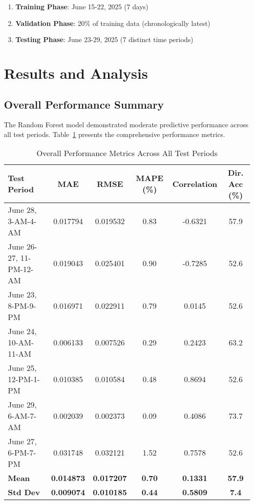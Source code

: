 \documentclass[11pt,a4paper]{article}
\begin{document}
\begin{enumerate}
    \item \textbf{Training Phase}: June 15-22, 2025 (7 days)
    \item \textbf{Validation Phase}: 20\% of training data (chronologically latest)
    \item \textbf{Testing Phase}: June 23-29, 2025 (7 distinct time periods)
\end{enumerate}

\section{Results and Analysis}

\subsection{Overall Performance Summary}

The Random Forest model demonstrated moderate predictive performance across all test periods. Table~\ref{tab:overall_performance} presents the comprehensive performance metrics.

\begin{table}[H]
\centering
\caption{Overall Performance Metrics Across All Test Periods}
\label{tab:overall_performance}
\begin{tabular}{lccccc}
\toprule
\textbf{Test Period} & \textbf{MAE} & \textbf{RMSE} & \textbf{MAPE (\%)} & \textbf{Correlation} & \textbf{Dir. Acc (\%)} \\
\midrule
June 28, 3-AM-4-AM & 0.017794 & 0.019532 & 0.83 & -0.6321 & 57.9 \\
June 26-27, 11-PM-12-AM & 0.019043 & 0.025401 & 0.90 & -0.7285 & 52.6 \\
June 23, 8-PM-9-PM & 0.016971 & 0.022911 & 0.79 & 0.0145 & 52.6 \\
June 24, 10-AM-11-AM & 0.006133 & 0.007526 & 0.29 & 0.2423 & 63.2 \\
June 25, 12-PM-1-PM & 0.010385 & 0.010584 & 0.48 & 0.8694 & 52.6 \\
June 29, 6-AM-7-AM & 0.002039 & 0.002373 & 0.09 & 0.4086 & 73.7 \\
June 27, 6-PM-7-PM & 0.031748 & 0.032121 & 1.52 & 0.7578 & 52.6 \\
\midrule
\textbf{Mean} & \textbf{0.014873} & \textbf{0.017207} & \textbf{0.70} & \textbf{0.1331} & \textbf{57.9} \\
\textbf{Std Dev} & \textbf{0.009074} & \textbf{0.010185} & \textbf{0.44} & \textbf{0.5809} & \textbf{7.4} \\
\bottomrule
\end{tabular}
\end{table}
\end{document}
